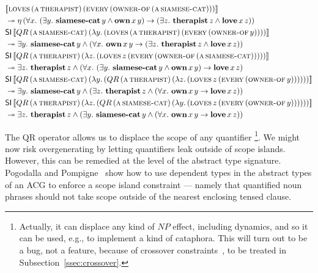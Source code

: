 \addtocounter{equation}{-1}
\NoChapterPrefix
\begin{align}
& \sem{\app{\abs{loves}}{(\ap{\abs{a}}{\abs{therapist}})}{(\ap{\abs{every}}{(\ap{\abs{owner-of}}{(\ap{\abs{a}}{\abs{siamese-cat}})})})}} \nonumber \\
&\tto \etaE{(\forall x.\ (\exists y.\ \ap{\obj{siamese-cat}}{y} \land \app{\obj{own}}{x}{y}) \to (\exists z.\ \ap{\obj{therapist}}{z} \land \app{\obj{love}}{x}{z}))} \\
\addtocounter{equation}{-1}
& \ap{\SI}{\sem{\app{QR}{(\ap{\abs{a}}{\abs{siamese-cat}})}{(\lam{y}{(\app{\abs{loves}}{(\ap{\abs{a}}{\abs{therapist}})}{(\ap{\abs{every}}{(\ap{\abs{owner-of}}{y})})})})}}} \nonumber \\
&\tto \exists y.\ \ap{\obj{siamese-cat}}{y} \land (\forall x.\ \app{\obj{own}}{x}{y} \to (\exists z.\ \ap{\obj{therapist}}{z} \land \app{\obj{love}}{x}{z})) \\
\addtocounter{equation}{-1}
& \ap{\SI}{\sem{\app{QR}{(\ap{\abs{a}}{\abs{therapist}})}{(\lam{z}{(\app{\abs{loves}}{z}{(\ap{\abs{every}}{(\ap{\abs{owner-of}}{(\ap{\abs{a}}{\abs{siamese-cat}})})})})})}}} \nonumber \\
&\tto \exists z.\ \ap{\obj{therapist}}{z} \land (\forall x.\ (\exists y.\ \ap{\obj{siamese-cat}}{y} \land \app{\obj{own}}{x}{y}) \to \app{\obj{love}}{x}{z}) \\
\addtocounter{equation}{-1}
& \ap{\SI}{\sem{\app{QR}{(\ap{\abs{a}}{\abs{siamese-cat}})}{(\lam{y}{(\app{QR}{(\ap{\abs{a}}{\abs{therapist}})}{(\lam{z}{(\app{\abs{loves}}{z}{(\ap{\abs{every}}{(\ap{\abs{owner-of}}{y})})})})})})}}} \nonumber \\
&\tto \exists y.\ \ap{\obj{siamese-cat}}{y} \land (\exists z.\ \ap{\obj{therapist}}{z} \land (\forall x.\ \app{\obj{own}}{x}{y} \to \app{\obj{love}}{x}{z})) \\
\addtocounter{equation}{-1}
& \ap{\SI}{\sem{\app{QR}{(\ap{\abs{a}}{\abs{therapist}})}{(\lam{z}{(\app{QR}{(\ap{\abs{a}}{\abs{siamese-cat}})}{(\lam{y}{(\app{\abs{loves}}{z}{(\ap{\abs{every}}{(\ap{\abs{owner-of}}{y})})})})})})}}} \nonumber \\
&\tto \exists z.\ \ap{\obj{therapist}}{z} \land (\exists y.\ \ap{\obj{siamese-cat}}{y} \land (\forall x.\ \app{\obj{own}}{x}{y} \to \app{\obj{love}}{x}{z}))
\end{align}
\ChapterPrefix

The QR operator allows us to displace the scope of any quantifier
\footnote{Actually, it can displace any kind of $NP$ effect, including
  dynamics, and so it can be used, e.g., to implement a kind of
  cataphora. This will turn out to be a bug, not a feature, because of
  crossover constraints~\cite{shan2006explaining}, to be treated in
  Subsection~\ref{ssec:crossover}.}. We might now risk overgenerating by
letting quantifiers leak outside of scope islands. However, this can be
remedied at the level of the abstract type signature. Pogodalla and
Pompigne~\cite{pogodalla2012controlling} show how to use dependent types in
the abstract types of an ACG to enforce a scope island constraint ---
namely that quantified noun phrases should not take scope outside of the
nearest enclosing tensed clause.



